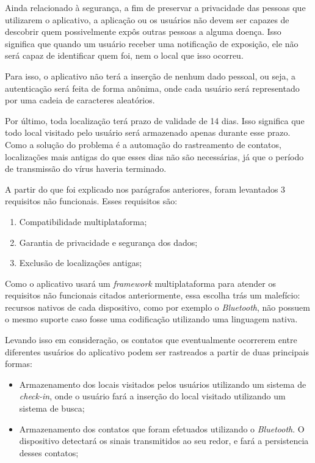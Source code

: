 Ainda relacionado à segurança, a fim de preservar a privacidade das pessoas que utilizarem o aplicativo, a aplicação ou os usuários não devem ser capazes de descobrir quem possivelmente expôs outras pessoas a alguma doença. Isso significa que quando um usuário receber uma notificação de exposição, ele não será capaz de identificar quem foi, nem o local que isso ocorreu.

Para isso, o aplicativo não terá a inserção de nenhum dado pessoal, ou seja, a autenticação será feita de forma anônima, onde cada usuário será representado por uma cadeia de caracteres aleatórios.

Por último, toda localização terá prazo de validade de 14 dias. Isso significa que todo local visitado pelo usuário será armazenado apenas durante esse prazo. Como a solução do problema é a automação do rastreamento de contatos, localizações mais antigas do que esses dias não são necessárias, já que o período de transmissão do vírus haveria terminado.

A partir do que foi explicado nos parágrafos anteriores, foram levantados 3 requisitos não funcionais. Esses requisitos são:

\begin{enumerate}
  \item Compatibilidade multiplataforma;
  \item Garantia de privacidade e segurança dos dados;
  \item Exclusão de localizações antigas;
\end{enumerate}

Como o aplicativo usará um \textit{framework} multiplataforma para atender os requisitos não funcionais citados anteriormente, essa escolha trás um malefício: recursos nativos de cada dispositivo, como por exemplo o \textit{Bluetooth}, não possuem o mesmo suporte caso fosse uma codificação utilizando uma linguagem nativa.

Levando isso em consideração, os contatos que eventualmente ocorrerem entre diferentes usuários do aplicativo podem ser rastreados a partir de duas principais formas: 

\begin{itemize}
  \item Armazenamento dos locais visitados pelos usuários utilizando um sistema de \textit{check-in}, onde o usuário fará a inserção do local visitado utilizando um sistema de busca;
  \item Armazenamento dos contatos que foram efetuados utilizando o \textit{Bluetooth}. O dispositivo detectará os sinais transmitidos ao seu redor, e fará a persistencia desses contatos;
\end{itemize}

